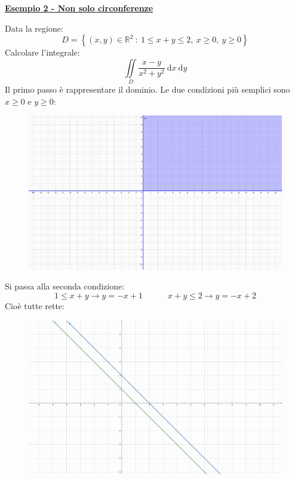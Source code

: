 \documentclass[a4paper]{article}
\newcommand{\example}[1]{\textcolor{Green4}{\textbf{#1}}}
\begin{document}
	\begin{flushleft}
		\example{\underline{Esempio 2 - Non solo circonferenze}}
	\end{flushleft}
	Data la regione:
	\begin{equation*}
		D = \left\{\left(x,y\right) \in \mathbb{R}^{2} \: : \: 1 \le x+y \le 2, \: x \ge 0, \: y \ge 0\right\}
	\end{equation*}
	Calcolare l'integrale:
	\begin{equation*}
		\displaystyle\iint\limits_{D} \dfrac{x-y}{x^{2}+y^{2}} \:\mathrm{d}x\:\mathrm{d}y
	\end{equation*}
	Il primo passo è rappresentare il dominio. Le due condizioni più semplici sono $x \ge 0$ e $y \ge 0$:
	\begin{figure}[!htp]
		\centering
		\includegraphics[width=.6\textwidth]{img/integrali_doppi-coordinate_polari-3.pdf}
	\end{figure}

	\noindent
	Si passa alla seconda condizione:
	\begin{equation*}
		1 \le x+y \longrightarrow y = -x + 1 \hspace{3em} x+y \le 2 \longrightarrow y = -x + 2
	\end{equation*}
	Cioè tutte rette:
	\begin{figure}[!htp]
		\centering
		\includegraphics[width=.6\textwidth]{img/integrali_doppi-coordinate_polari-4.pdf}
	\end{figure}

	\newpage
\end{document}
